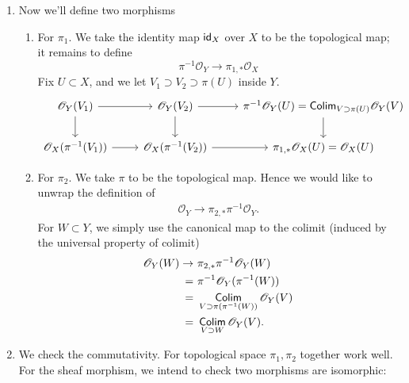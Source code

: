\begin{enumerate}
    \item Now we'll define two morphisms 
    \begin{enumerate}
        \item For $\pi_1$. We take the identity map $\operatorname{\mathsf{id}}_{X}$ over $X$ to be the topological map; it remains to define
        \[\pi^{-1}\mathscr O_Y\to \pi_{1,\ast}\mathscr O_X\]
        Fix $U\subset X$, and we let $V_1\supset V_2\supset \pi(U)$ inside $Y$.
        \[%
        \begin{tikzcd}
        \mathscr O_Y(V_1) \arrow[r] \arrow[d] & \mathscr O_Y(V_2) \arrow[d] \arrow[r] & \pi^{-1}\mathscr O_Y(U)=\mathsf{Colim}_{V\supset \pi(U)} \mathscr O_Y(V) \arrow[d] \\
        \mathscr O_X(\pi^{-1}(V_1)) \arrow[r] & \mathscr O_X(\pi^{-1}(V_2)) \arrow[r] & {\pi_{1,\ast}\mathscr O_X(U)=\mathscr O_X(U)}                                   
        \end{tikzcd}\]
    \item For $\pi_2$. We take $\pi$ to be the topological map. Hence we would like to unwrap the definition of 
    \begin{align}
        \mathscr O_Y\to \pi_{2,\ast}\pi^{-1}\mathscr O_Y.
    \end{align}
    For $W\subset Y$, we simply use the canonical map to the colimit (induced by the universal property of colimit) 
    \begin{align}
        \mathscr O_Y(W)\to &~\pi_{2,\ast}\pi^{-1}\mathscr O_Y(W)\\ 
        =&~\pi^{-1}\mathscr O_Y(\pi^{-1}(W))\\
        =&~\operatorname*{\mathsf{Colim}} _{V\supset \pi(\pi^{-1}(W))}\mathscr O_Y(V)\\
        =&~\operatorname*{\mathsf{Colim}} _{V\supset W}\mathscr O_Y(V).
    \end{align}
    \end{enumerate}
    \item We check the commutativity. For topological space $\pi_1,\pi_2$ together work well. For the sheaf morphism, we intend to check two morphisms are isomorphic:

\end{enumerate}

